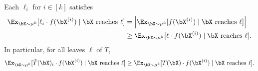 



Each $\ell_i$ for $i\in [k]$ satisfies
\begin{align*}
    \Ex_{\bX\sim\mu^{k}}[\ell_i\cdot f(\bX^{(i)})\mid\bX\text{ reaches }\ell]&=\left|\Ex_{\bX\sim\mu^{k}}[f(\bX^{(i)})\mid\bX\text{ reaches }\ell]\right|\\
    &\ge \Ex_{\bX\sim\mu^{k}}[\ell\cdot f(\bX^{(i)})\mid\bX\text{ reaches }\ell].
\end{align*}
In particular, for all {leaves} $\ell$ of $T$,
\begin{equation}
\label{eq:corr}
    \Ex_{\bX\sim\mu^{k}}[\Tilde{T}(\bX)_i\cdot f(\bX^{(i)})\mid\bX\text{ reaches }\ell]\ge \Ex_{\bX\sim\mu^{k}}[T(\bX)\cdot f(\bX^{(i)})\mid\bX\text{ reaches }\ell].
\end{equation}

